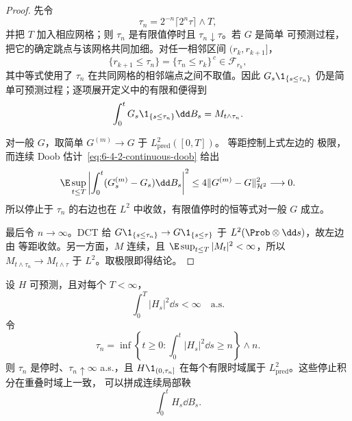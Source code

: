 \begin{proof}
先令
\[
 \tau_n=2^{-n}\lceil2^n\tau\rceil\wedge T,
\]
并把 $T$ 加入相应网格；则 $\tau_n$ 是有限值停时且 $\tau_n\downarrow\tau$。若 $G$ 是简单
可预测过程，把它的确定跳点与该网格共同加细。对任一相邻区间 $(r_k,r_{k+1}]$，
\[
 \{r_{k+1}\le\tau_n\}
 =\{\tau_n\le r_k\}^{\,c}\in\mathcal F_{r_k},
\]
其中等式使用了 $\tau_n$ 在共同网格的相邻端点之间不取值。因此
$G_s\1_{\{s\le\tau_n\}}$ 仍是简单可预测过程；逐项展开定义中的有限和便得到
\[
 \int_0^tG_s\1_{\{s\le\tau_n\}}\dd B_s=M_{t\wedge\tau_n}.
\]

对一般 $G$，取简单 $G^{(m)}\to G$ 于 $L^2_{\mathrm{pred}}([0,T])$。\Ito{} 等距控制上式左边的
极限，而连续 Doob 估计~\eqref{eq:6-4-2-continuous-doob} 给出
\[
 \E\sup_{t\le T}\left|
 \int_0^t(G_s^{(m)}-G_s)\dd B_s\right|^2
 \le4\|G^{(m)}-G\|_{\mathcal H^2}^2\longrightarrow0.
\]
所以停止于 $\tau_n$ 的右边也在 $L^2$ 中收敛，有限值停时的恒等式对一般 $G$ 成立。

最后令 $n\to\infty$。DCT 给
$G\1_{\{s\le\tau_n\}}\to G\1_{\{s\le\tau\}}$ 于
$L^2(\Prob\otimes\dd s)$，故左边由 \Ito{} 等距收敛。另一方面，$M$ 连续，且
$\E\sup_{t\le T}|M_t|^2<\infty$，所以
$M_{t\wedge\tau_n}\to M_{t\wedge\tau}$ 于 $L^2$。取极限即得结论。
\end{proof}

\begin{proposition}[局部平方可积被积过程]\label{proposition:6-4-2-localization}
设 $H$ 可预测，且对每个 $T<\infty$，
\[
 \int_0^T|H_s|^2\dd s<\infty\quad\text{a.s.}
\]
令
\[
 \tau_n=\inf\left\{t\ge0:\int_0^t|H_s|^2\dd s\ge n\right\}\wedge n.
\]
则 $\tau_n$ 是停时、$\tau_n\uparrow\infty$ a.s.，且
$H\1_{(0,\tau_n]}$ 在每个有限时域属于 $L^2_{\mathrm{pred}}$。这些停止积分在重叠时域上一致，
可以拼成连续局部鞅
\[
 \int_0^tH_s\dd B_s.
\]
\end{proposition}


